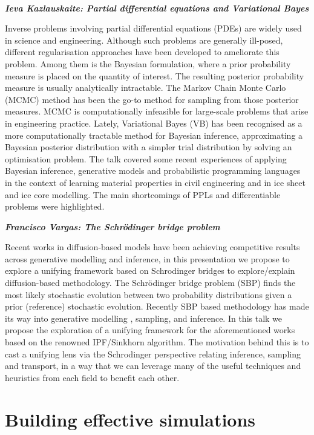 {~

\emph{\textbf{Ieva Kazlauskaite: Partial differential equations and
Variational Bayes}}

Inverse problems involving partial differential equations (PDEs) are
widely used in science and engineering. Although such problems are
generally ill-posed, different regularisation approaches have been
developed to ameliorate this problem. Among them is the Bayesian
formulation, where a prior probability measure is placed on the quantity
of interest. The resulting posterior probability measure is usually
analytically intractable. The Markov Chain Monte Carlo (MCMC) method has
been the go-to method for sampling from those posterior measures. MCMC
is computationally infeasible for large-scale problems that arise in
engineering practice. Lately, Variational Bayes (VB) has been recognised
as a more computationally tractable method for Bayesian inference,
approximating a Bayesian posterior distribution with a simpler trial
distribution by solving an optimisation problem. The talk covered some
recent experiences of applying Bayesian inference, generative models and
probabilistic programming languages in the context of learning material
properties in civil engineering and in ice sheet and ice core modelling.
The main shortcomings of PPLs and differentiable problems were
highlighted.~

\emph{\textbf{Francisco Vargas: The Schrödinger bridge problem}}

Recent works in diffusion-based models have been achieving competitive
results across generative modelling and inference, in this presentation
we propose to explore a unifying framework based on Schrodinger bridges
to explore/explain diffusion-based methodology. The Schrödinger bridge
problem (SBP) finds the most likely stochastic evolution between two
probability distributions given a prior (reference) stochastic
evolution. Recently SBP based methodology has made its way into
generative modelling , sampling, and inference. In this talk we propose
the exploration of a unifying framework for the aforementioned works
based on the renowned IPF/Sinkhorn algorithm. The motivation behind this
is to cast a unifying lens via the Schrodinger perspective relating
inference, sampling and transport, in a way that we can leverage many of
the useful techniques and heuristics from each field to benefit each
other.

\hypertarget{building-effective-simulations}{%
\section{Building effective
simulations}\label{building-effective-simulations}}

}
